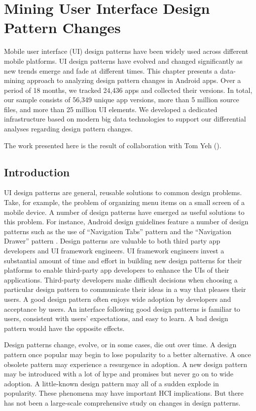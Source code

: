 \chapter{Mining User Interface Design Pattern Changes}
\label{ch:mining_design_changes_chapter}
Mobile user interface (UI) design patterns have been widely used across different mobile platforms.
UI design patterns have evolved and changed significantly as new trends emerge and fade at different times.
This chapter presents a data-mining approach to analyzing design pattern changes in Android apps.
Over a period of 18 months, we tracked 24,436 apps and collected their versions.
In total, our sample consists of 56,349 unique app versions, more than 5 million source files, and more than 25 million UI elements.
We developed a dedicated infrastructure based on modern big data technologies to support our differential analyses regarding design pattern changes.

The work presented here is the result of collaboration with Tom Yeh (\cite{Alharbi_2015_MobileHCI}).
\section{Introduction}
UI design patterns are general, reusable solutions to common design problems.
Take, for example, the problem of organizing menu items on a small screen of a mobile device.
A number of design patterns have emerged as useful solutions to this problem.
For instance, Android design guidelines feature a number of design patterns such as the use of ``Navigation Tabs'' pattern \cite{action_bar_nav_tabs} and the ``Navigation Drawer'' pattern \cite{nav_drawer}.
Design patterns are valuable to both third party app developers and UI framework engineers.
UI framework engineers invest a substantial amount of time and effort in building new design patterns for their platforms to enable third-party app developers to enhance the UIs of their applications.
Third-party developers make difficult decisions when choosing a particular design pattern to communicate their ideas in a way that pleases their users.
A good design pattern often enjoys wide adoption by developers and acceptance by users.
An interface following good design patterns is familiar to users, consistent with users' expectations, and easy to learn.
A bad design pattern would have the opposite effects.

\par Design patterns change, evolve, or in some cases, die out over time.
A design pattern once popular may begin to lose popularity to a better alternative. 
A once obsolete pattern may experience a resurgence in adoption.
A new design pattern may be introduced with a lot of hype and promises but never go on to wide adoption.
A little-known design pattern may all of a sudden explode in popularity.
These phenomena may have important HCI implications. But there has not been a large-scale comprehensive study on changes in design patterns.

